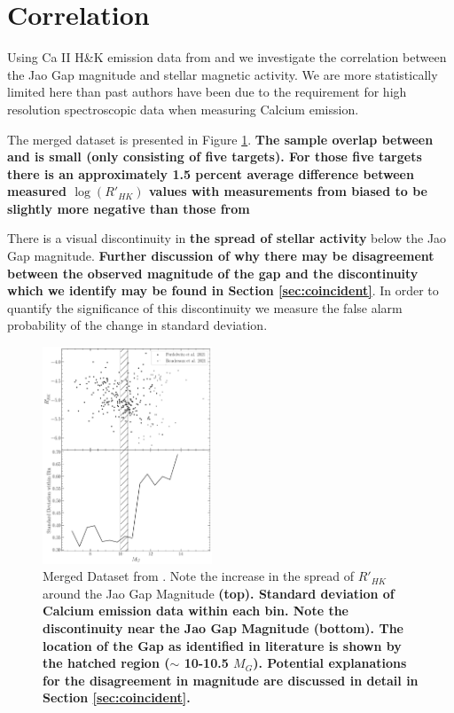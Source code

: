 \section{Correlation}\label{sec:results}
Using Ca II H\&K emission data from \citet{Perdelwitz2021} and
\citet{Boudreaux2022} \citep[quantified using the $R'_{HK}$
metric][]{Middelkoop1982, Rutten1984} we investigate the correlation between
the Jao Gap magnitude and stellar magnetic activity. We are more statistically
limited here than past authors have been due to the requirement for high
resolution spectroscopic data when measuring Calcium emission.

The merged dataset is presented in Figure \ref{fig:initData}. \textbf{The
sample overlap between \citet{Perdelwitz2021} and \citet{Boudreaux2022} is
small (only consisting of five targets). For those five targets there is an
approximately 1.5 percent average difference between measured $\log(R'_{HK})$
values with measurements from \citeauthor{Boudreaux2022} biased to be slightly
more negative than those from \citeauthor{Perdelwitz2021}}

There is a visual discontinuity in \textbf{the spread of stellar activity}
below the Jao Gap magnitude. \textbf{Further discussion of why there may be
disagreement between the observed magnitude of the gap and the discontinuity
which we identify may be found in Section \ref{sec:coincident}}. In order to
quantify the significance of this discontinuity we measure the false alarm
probability of the change in standard deviation.

\begin{figure}
  \centering
  \includegraphics[width=0.45\textwidth]{figures/CombinedDeviation.pdf}
  \caption{Merged Dataset from \citet{Perdelwitz2021, Boudreaux2022}. Note the
  increase in the spread of $R'_{HK}$ around the Jao Gap Magnitude \textbf{(top).
  Standard deviation of Calcium emission data within each bin. Note the
  discontinuity near the Jao Gap Magnitude (bottom). The location of the Gap
  as identified in literature is shown by the hatched region ($\sim$ 10-10.5 $M_{G}$). Potential
  explanations for the disagreement in magnitude are discussed in detail
  in Section \ref{sec:coincident}.}}
  \label{fig:initData}
\end{figure}

